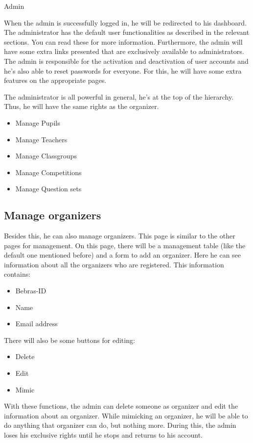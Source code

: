 \begin{section}{Admin}

When the admin is successfully logged in, he will be redirected to his dashboard. The administrator has the default user functionalities as described in the relevant sections. You can read these for more information. Furthermore, the admin will have some extra links presented that are exclusively available to administrators. \\
The admin is responsible for the activation and deactivation of user accounts and he's also able to reset passwords for everyone. For this, he will have some extra features on the appropriate pages.

The administrator is all powerful in general, he's at the top of the hierarchy. Thus, he will have the same rights as the organizer.
\begin{itemize}
\item Manage Pupils
\item Manage Teachers
\item Manage Classgroups
\item Manage Competitions
\item Manage Question sets
\end{itemize}

\subsection{Manage organizers}
Besides this, he can also manage organizers. This page is similar to the other pages for management. On this page, there will be a management table (like the default one mentioned before) and a form to add an organizer. Here he can see information about all the organizers who are registered. This information contains:
\begin{itemize}
\item Bebras-ID
\item Name
\item Email address
\end{itemize}

There will also be some buttons for editing:
\begin{itemize}
\item Delete
\item Edit
\item Mimic
\end{itemize}

With these functions, the admin can delete someone as organizer and edit the information about an organizer. While mimicking an organizer, he will be able to do anything that organizer can do, but nothing more. During this, the admin loses his exclusive rights until he stops and returns to his account.


\end{section}
